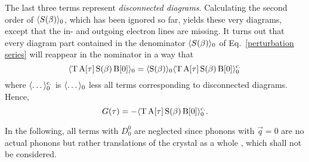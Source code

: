 The last three terms represent \emph{disconnected diagrams}. Calculating the
second order of $\langle S(\beta)\rangle_0$, which has been ignored so far, yields these
very diagrams, except that the in- and outgoing electron lines are missing. It
turns out that every diagram part contained in the denominator $\langle S(\beta)\rangle_0$
of Eq.~\ref{perturbation series} will reappear in the nominator in a way that
%
\begin{equation*}
    \langle\mathrm T \, \mathrm A[\tau] \, \mathrm S(\beta) \, \mathrm B[0]\rangle_0 =
    \langle\mathrm S(\beta)\rangle_0
    \langle\mathrm T \, \mathrm A[\tau] \, \mathrm S(\beta) \, \mathrm B[0]\rangle_0 \sp{\text{c.}}
\end{equation*}
%
where $\langle\dots\rangle_0 \sp{\text{c.}}$ is $\langle\dots\rangle_0$ less all terms corresponding to
disconnected diagrams. Hence,
%
\begin{equation*}
    G(\tau) = -\langle\mathrm T \, \mathrm A[\tau] \, \mathrm S(\beta) \, \mathrm B[0]\rangle_0
    \sp{\text{c.}}.
\end{equation*}

In the following, all terms with $D^0_0$ are neglected since phonons with $\vec
q = 0$ are no actual phonons but rather translations of the crystal as a whole
\cite[p.~82]{Mahan00}, which shall not be considered.

